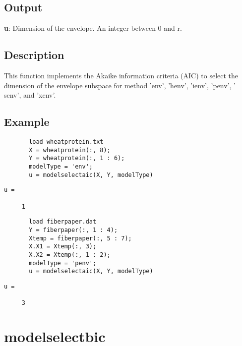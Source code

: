 \documentclass[a4paper,11pt,openany]{memoir}
\begin{document}
\subsection*{Output}

\begin{par}
\textbf{u}: Dimension of the envelope. An integer between 0 and r.
\end{par} \vspace{1em}


\subsection*{Description}

\begin{par}
This function implements the Akaike information criteria (AIC) to select the dimension of the envelope subspace for method 'env', 'henv', 'ienv', 'penv', ' senv', and 'xenv'.
\end{par} \vspace{1em}


\subsection*{Example}


\begin{verbatim}       load wheatprotein.txt
       X = wheatprotein(:, 8);
       Y = wheatprotein(:, 1 : 6);
       modelType = 'env';
       u = modelselectaic(X, Y, modelType)\end{verbatim}
\color{lightgray}\ttfamily\begin{verbatim}
u =

     1

\end{verbatim}  \rmfamily
\color{black}
\begin{verbatim}       load fiberpaper.dat
       Y = fiberpaper(:, 1 : 4);
       Xtemp = fiberpaper(:, 5 : 7);
       X.X1 = Xtemp(:, 3);
       X.X2 = Xtemp(:, 1 : 2);
       modelType = 'penv';
       u = modelselectaic(X, Y, modelType)\end{verbatim}
    

\color{lightgray}\ttfamily\begin{verbatim}
u =

     3

\end{verbatim} \rmfamily
\color{black}
    
\newpage


\rmfamily
\color{black}\section{modelselectbic}
\end{document}
